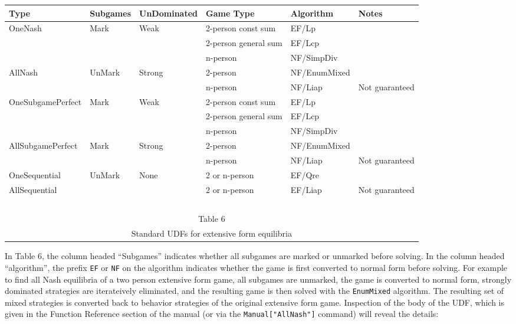 \medskip
\begin{center}
\begin{tabular}{|l|l|l|p{2cm}|l|l|}
\hline
Type & Subgames & UnDominated & Game Type & Algorithm & Notes\\
\hline
OneNash & Mark & Weak &  2-person const sum & EF/Lp &\\ \cline{4-6}
        &      &      &  2-person general sum & EF/Lcp &\\ \cline{4-6}
        &      &      &  n-person             & NF/SimpDiv &\\
\hline
AllNash &  UnMark & Strong &  2-person       & NF/EnumMixed &\\ \cline{4-6}
        &         &        &  n-person       & NF/Liap &Not guaranteed\\
\hline
\hline
OneSubgamePerfect &  Mark & Weak &  2-person const sum& EF/Lp &\\ \cline{4-6}
                  &       &      &  2-person general sum & EF/Lcp &\\ \cline{4-6}
                  &       &      &  n-person        & NF/SimpDiv &\\
\hline
AllSubgamePerfect &  Mark & Strong &  2-person    & NF/EnumMixed &\\ \cline{4-6}
                  &       &        &  n-person    & NF/Liap &Not guaranteed\\
\hline
\hline
OneSequential &  UnMark & None &  2 or n-person   & EF/Qre &\\ \cline{4-6}
\hline
AllSequential &         &       &  2 or n-person   & EF/Liap &Not guaranteed\\
\hline
\multicolumn{6}{c}{\ }\\
\multicolumn{6}{c}{Table 6}\\
\multicolumn{6}{c}{Standard UDFs for extensive form equilibria}\\
\end{tabular}
\end{center}
\medskip

In Table 6, the column headed ``Subgames'' indicates whether all
subgames are marked or unmarked before solving.  In the column headed
``algorithm'', the prefix \verb+EF+ or \verb+NF+ on the algorithm
indicates whether the game is first converted to normal form before
solving.  For example to find all Nash equilibria of a two person
extensive form game, all subgames are unmarked, the game is converted
to normal form, strongly dominated strategies are iterateively
eliminated, and the resulting game is then solved with the
\verb+EnumMixed+ algorithm.  The resulting set of mixed strategies is
converted back to behavior strategies of the original extensive form
game.  Inspection of the body of the UDF, which is given in the
Function Reference section of the manual (or via the
\verb+Manual["AllNash"]+ command) will reveal the details:

